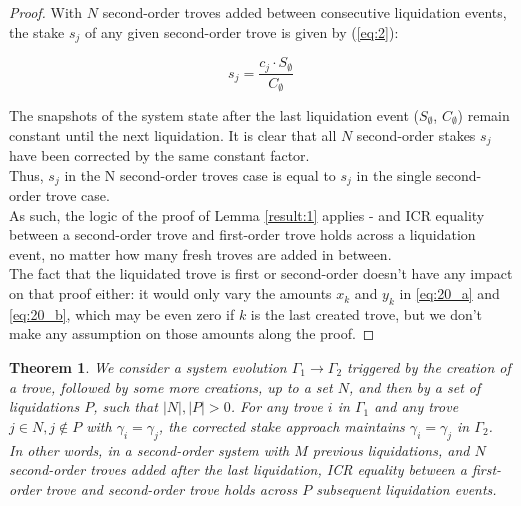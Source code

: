 \documentclass[reqno]{article}
\newtheorem{theorem}{Theorem}[section]
\begin{document}
\begin{proof}
With $N$ second-order troves added between consecutive liquidation events, the stake $s_j$ of any given second-order trove is given by (\ref{eq:2}):

\begin{equation} 
    s_j=\frac{c_j \cdot S_\emptyset}{C_\emptyset}
\end{equation}

\bigskip
The snapshots of the system state after the last liquidation event ($S_\emptyset$, $C_\emptyset$) remain constant until the next liquidation. It is clear that all $N$ second-order stakes $s_j$ have been corrected by the same constant factor.\\

Thus, $s_j$ in the N second-order troves case is equal to $s_j$ in the single second-order trove case.\\

As such, the logic of the proof of Lemma \ref{result:1} applies - and ICR equality between a second-order trove and first-order trove holds across a liquidation event, no matter how many fresh troves are added in between.\\
The fact that the liquidated trove is first or second-order doesn’t have any impact on that proof either: it would only vary the amounts $x_k$ and $y_k$ in \ref{eq:20_a} and \ref{eq:20_b}, which may be even zero if $k$ is the last created trove, but we don’t make any assumption on those amounts along the proof.
\end{proof}

\begin{theorem} \label{result:4}
We consider a system evolution $\Gamma_1 \rightarrow \Gamma_2$ triggered by the creation of a trove, followed by some more creations, up to a set $N$, and then by a set of liquidations $P$, such that $|N|, |P| > 0$. For any trove $i$ in $\Gamma_1$ and any trove $j \in N, j\notin P$ with $\gamma_i = \gamma_j$, the corrected stake approach maintains $\gamma_i = \gamma_j$ in $\Gamma_2$. \\
In other words, in a second-order system with $M$ previous liquidations, and $N$ second-order troves added after the last liquidation, ICR equality between a first-order trove and second-order trove holds across $P$ subsequent liquidation events.
\end{theorem}
\end{document}
